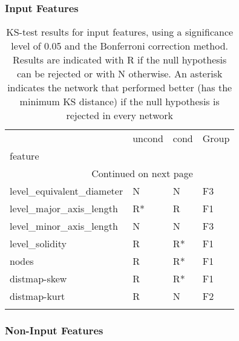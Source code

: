 	\subsubsection{Input Features}
	\begin{longtable}{llll}
		\caption[Test results for input features]{ \small KS-test results for input features, using a significance level of 0.05 and the Bonferroni correction method. Results are indicated with R if the null hypothesis can be rejected or with N otherwise. An asterisk indicates the network that performed better (has the minimum KS distance) if the null hypothesis is rejected in every network}\\
		\toprule
		{} & uncond & cond & Group \\
		feature                   &        &      &       \\
		\midrule
		\endhead
		\midrule
		\multicolumn{3}{r}{{Continued on next page}} \\
		\midrule
		\endfoot
		
		\bottomrule
		\endlastfoot
		level\_equivalent\_diameter &      N &    N &    F3 \\
		level\_major\_axis\_length   &     R* &    R &    F1 \\
		level\_minor\_axis\_length   &      N &    N &    F3 \\
		level\_solidity            &      R &   R* &    F1 \\
		nodes                     &      R &   R* &    F1 \\
		distmap-skew              &      R &   R* &    F1 \\
		distmap-kurt              &      R &    N &    F2 \\
		\label{tab:results-input-features}
	\end{longtable}
	
	
	\subsubsection{Non-Input Features}	
	
